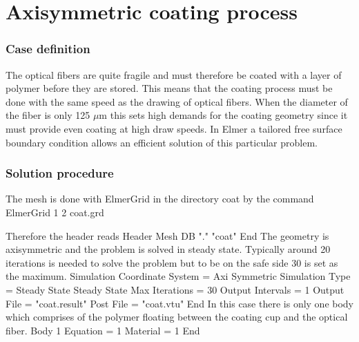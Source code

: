 \chapter{Axisymmetric coating process}


\subsection*{Case definition}

The optical fibers are quite fragile and must therefore be coated with
a layer of polymer before they are stored.  This means that the
coating process must be done with the same speed as the drawing of
optical fibers.  When the diameter of the fiber is only 125 $\mu$m
this sets high demands for the coating geometry since it must provide
even coating at high draw speeds. In Elmer a tailored free surface
boundary condition allows an efficient solution of this particular
problem.


\subsection*{Solution procedure}

The mesh is done with ElmerGrid in the directory coat by the command
%
\ttbegin
ElmerGrid 1 2 coat.grd
\ttend

Therefore the header reads 
\ttbegin
Header
  Mesh DB "." "coat"
End
\ttend
%
The geometry is axisymmetric and the problem is solved in steady state. Typically around 20
iterations is needed to solve the problem but to be on the safe side 30 is set as the maximum.
\ttbegin
Simulation
  Coordinate System = Axi Symmetric
  Simulation Type = Steady State
  Steady State Max Iterations = 30
  Output Intervals = 1
  Output File = "coat.result"
  Post File = "coat.vtu"
End
\ttend
%
In this case there is only one body which comprises of the polymer 
floating between the coating cup and the optical fiber.
\ttbegin
Body 1
  Equation = 1
  Material = 1
End
\ttend

